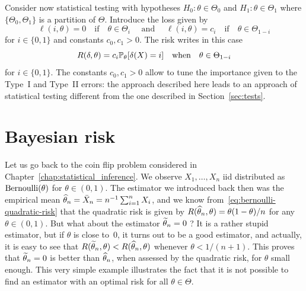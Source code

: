 Consider now statistical testing with hypotheses $H_0 : \theta \in \Theta_0$ and $H_1 : \theta \in \Theta_1$ where $\{ \Theta_0, \Theta_1 \}$ is a partition of $\Theta$.
Introduce the loss given by
\begin{equation}
	\label{eq:bayes-test-loss}
	\ell(i, \theta) = 0	\quad \text{if} \quad \theta \in \Theta_i \quad \text{ and } \quad \ell(i, \theta) = c_i \quad \text{if} \quad \theta \in \Theta_{1 - i}
\end{equation}
for $i \in \{ 0, 1 \}$ and constants $c_0, c_1 > 0$.
The risk writes in this case
\begin{equation*}
	R(\delta, \theta) =	c_i \P_\theta [\delta(X) = i] \quad \text{when} 
	\quad \theta \in \Theta_{1 - i}
\end{equation*}
for $i \in \{ 0, 1 \}$.
The constants $c_0, c_1 > 0$ allow to tune the importance given to the Type~I and Type~II errors: the approach described here leads to an approach of statistical testing different from the one described in Section~\ref{sec:tests}.


\section{Bayesian risk} %
\label{sec:bayesian-risk}

Let us go back to the coin flip problem considered in Chapter~\ref{chap:statistical_inference}.
We observe $X_1, \ldots, X_n$ iid distributed as $\ber(\theta)$ for $\theta \in (0, 1)$.
The estimator we introduced back then was the empirical mean $\wh \theta_n = \bar X_n = n^{-1} \sum_{i=1}^n X_i$, and we know from~\eqref{eq:bernoulli-quadratic-risk} that the quadratic risk is given by $R(\wh \theta_n, \theta) = \theta (1 - \theta) / n$ for any $\theta \in (0, 1)$.
But what about the estimator $\wt \theta_n = 0$ ? It is a rather stupid estimator, but if $\theta$ is close to~$0$, it turns out to be a good estimator, and actually, it is easy to see that
$R(\wt \theta_n, \theta) < R(\wh \theta_n, \theta)$ whenever $\theta < 1 / (n + 1)$.
This proves that $\wt \theta_n = 0$ is better than $\wh \theta_n$, when assessed by the quadratic risk, for $\theta$ small enough.%
This very simple example illustrates the fact that it is not possible to find an estimator with an optimal risk for all $\theta \in \Theta$.

